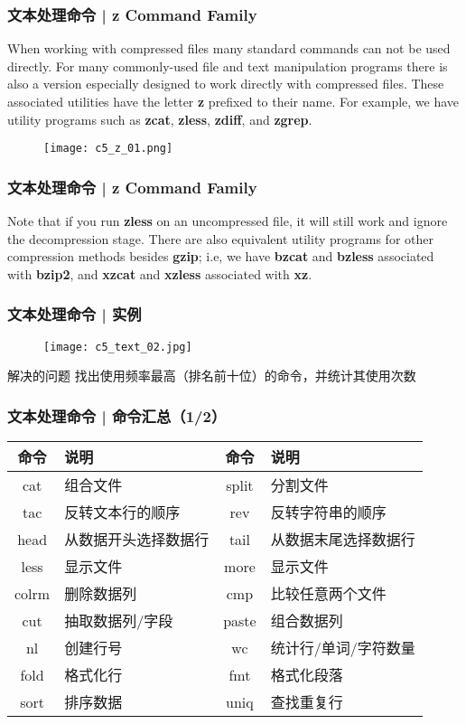 \begin{frame}
  \frametitle{文本处理命令 | z Command Family}
  When working with compressed files many standard commands can not be used directly. For many commonly-used file and text manipulation programs there is also a version especially designed to work directly with compressed files. These associated utilities have the letter \textbf{z} prefixed to their name. For example, we have utility programs such as \textbf{zcat}, \textbf{zless}, \textbf{zdiff}, and \textbf{zgrep}.\\
  \begin{figure}
    \centering
    \texttt{[image: c5\_z\_01.png]}
  \end{figure}
\end{frame}

\begin{frame}
  \frametitle{文本处理命令 | z Command Family}
  Note that if you run \textbf{zless} on an uncompressed file, it will still work and ignore the decompression stage. There are also equivalent utility programs for other compression methods besides \textbf{gzip}; i.e, we have \textbf{bzcat} and \textbf{bzless} associated with \textbf{bzip2}, and \textbf{xzcat} and \textbf{xzless} associated with \textbf{xz}.
\end{frame}

\begin{frame}
  \frametitle{文本处理命令 | \alert{实例}}
  \begin{figure}
    \centering
    \texttt{[image: c5\_text\_02.jpg]}
  \end{figure}
  \pause
  \begin{block}{解决的问题}
    找出使用频率最高（排名前十位）的命令，并统计其使用次数
  \end{block}
\end{frame}

\begin{frame}
  \frametitle{文本处理命令 | 命令汇总（1/2）}
  \begin{table}
    \centering
    \begin{tabularx}{\textwidth}{cX|cX}
      \hline
      \rowcolor{blue!50}命令 & 说明 & 命令 & 说明\\
      \hline
      cat & 组合文件 & split & 分割文件\\
      tac & 反转文本行的顺序 & rev & 反转字符串的顺序\\
      head & 从数据开头选择数据行 & tail & 从数据末尾选择数据行\\
      less & 显示文件 & more & 显示文件\\
      colrm & 删除数据列 & cmp & 比较任意两个文件\\
      cut & 抽取数据列/字段 & paste & 组合数据列\\
      nl & 创建行号 & wc & 统计行/单词/字符数量\\
      fold & 格式化行 & fmt & 格式化段落\\
      sort & 排序数据 & uniq & 查找重复行\\
      \hline
    \end{tabularx}
  \end{table}
\end{frame}

